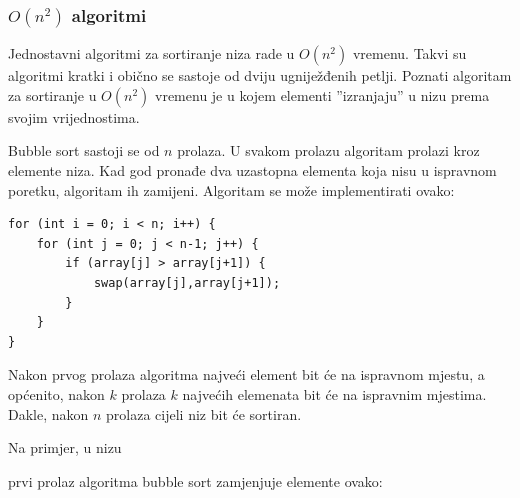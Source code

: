 \subsubsection{$O(n^2)$ algoritmi}


Jednostavni algoritmi za sortiranje niza
rade u $O(n^2)$ vremenu.
Takvi su algoritmi kratki i obično se
sastoje od dviju ugniježđenih petlji.
Poznati algoritam za sortiranje u $O(n^2)$ vremenu
je  u kojem elementi
''izranjaju'' u nizu prema svojim vrijednostima.

Bubble sort sastoji se od $n$ prolaza.
U svakom prolazu algoritam prolazi kroz
elemente niza.
Kad god pronađe dva uzastopna elementa
koja nisu u ispravnom poretku,
algoritam ih zamijeni.
Algoritam se može implementirati ovako:
\begin{lstlisting}
for (int i = 0; i < n; i++) {
    for (int j = 0; j < n-1; j++) {
        if (array[j] > array[j+1]) {
            swap(array[j],array[j+1]);
        }
    }
}
\end{lstlisting}

Nakon prvog prolaza algoritma
najveći element bit će na ispravnom mjestu,
a općenito, nakon $k$ prolaza $k$ najvećih
elemenata bit će na ispravnim mjestima.
Dakle, nakon $n$ prolaza cijeli niz
bit će sortiran.

Na primjer, u nizu

\begin{center}
\end{center}

\noindent
prvi prolaz algoritma bubble sort zamjenjuje elemente
ovako:

\begin{center}
\end{center}

